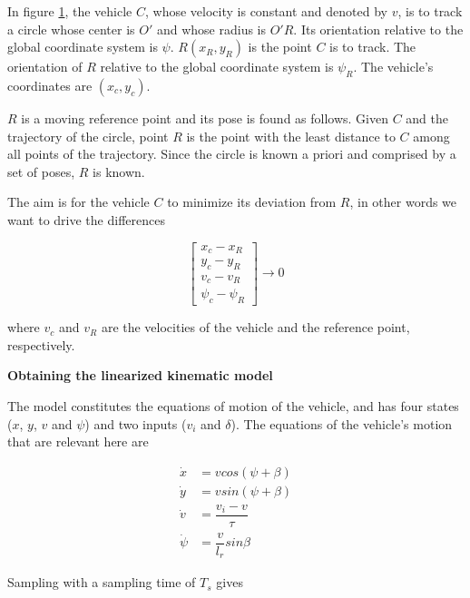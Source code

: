 In figure \ref{fig:circular_mpc}, the vehicle $C$, whose velocity is constant
and denoted by $v$, is to track a circle whose center is $O'$ and whose
radius is $O'R$. Its orientation relative to the global coordinate system is
$\psi$. $R(x_R, y_R)$ is the point $C$ is to track. The orientation of $R$
relative to the global coordinate system is $\psi_R$. The vehicle's coordinates
are $(x_c, y_c)$.


\begin{figure}[H]\centering
  \scalebox{0.8}{}
  \caption{}
  \label{fig:circular_mpc}
\end{figure}

$R$ is a moving reference point and its pose is found as follows. Given $C$ and
the trajectory of the circle, point $R$ is the point with the least distance
to $C$ among all points of the trajectory. Since the circle is known a priori
and comprised by a set of poses, $R$ is known.

The aim is for the vehicle $C$ to minimize its deviation from $R$, in other
words we want to drive the differences

\begin{equation}
  \begin{bmatrix}
    x_c - x_R \\
    y_c - y_R \\
    v_c - v_R \\
    \psi_c - \psi_R
  \end{bmatrix}
  \rightarrow 0
\end{equation}

where $v_c$ and $v_R$ are the velocities of the vehicle and the reference
point, respectively.

\textbf{Obtaining the linearized kinematic model}

The model constitutes the equations of motion of the vehicle, and has four
states ($x$, $y$, $v$ and $\psi$) and two inputs ($v_i$ and $\delta$). The
equations of the vehicle's motion that are relevant here are

\begin{align}
  \dot{x} &= v cos(\psi + \beta) \\
  \dot{y} &= v sin(\psi + \beta) \\
  \dot{v} &= \dfrac{v_i - v}{\tau} \\
  \dot{\psi} &= \dfrac{v}{l_r} sin\beta
\end{align}

Sampling with a sampling time of $T_s$ gives

